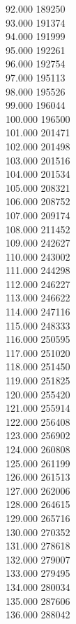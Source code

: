 { 92.000	189250 \\
 93.000	191374 \\
 94.000	191999 \\
 95.000	192261 \\
 96.000	192754 \\
 97.000	195113 \\
 98.000	195526 \\
 99.000	196044 \\
 100.000	196500 \\
 101.000	201471 \\
 102.000	201498 \\
 103.000	201516 \\
 104.000	201534 \\
 105.000	208321 \\
 106.000	208752 \\
 107.000	209174 \\
 108.000	211452 \\
 109.000	242627 \\
 110.000	243002 \\
 111.000	244298 \\
 112.000	246227 \\
 113.000	246622 \\
 114.000	247116 \\
 115.000	248333 \\
 116.000	250595 \\
 117.000	251020 \\
 118.000	251450 \\
 119.000	251825 \\
 120.000	255420 \\
 121.000	255914 \\
 122.000	256408 \\
 123.000	256902 \\
 124.000	260808 \\
 125.000	261199 \\
 126.000	261513 \\
 127.000	262006 \\
 128.000	264615 \\
 129.000	265716 \\
 130.000	270352 \\
 131.000	278618 \\
 132.000	279007 \\
 133.000	279495 \\
 134.000	280034 \\
 135.000	287606 \\
 136.000	288042 \\
}
